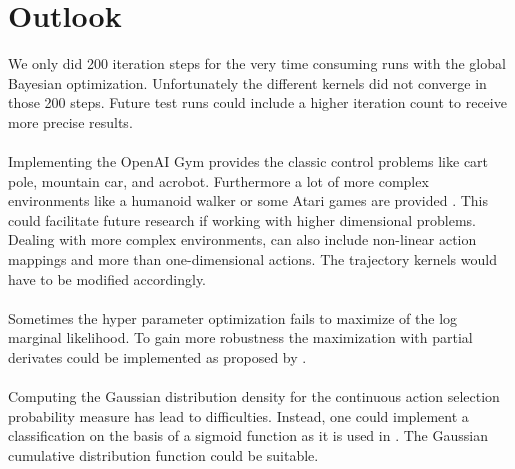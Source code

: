 \chapter{Outlook}
\label{chap:7}

We only did 200 iteration steps for the very time consuming runs with the global Bayesian optimization. Unfortunately the different kernels did not converge in those 200 steps. Future test runs could include a higher iteration count to receive more precise results.\\
\\
Implementing the OpenAI Gym provides the classic control problems like cart pole, mountain car, and acrobot. Furthermore a lot of more complex environments like a humanoid walker or some Atari games are provided \cite{DBLP:journals/corr/BrockmanCPSSTZ16}. This could facilitate future research if working with higher dimensional problems.\\
Dealing with more complex environments, can also include non-linear action mappings and more than one-dimensional actions. The trajectory kernels would have to be modified accordingly.\\
\\
Sometimes the hyper parameter optimization fails to maximize of the log marginal likelihood. To gain more robustness the maximization with partial derivates could be implemented as proposed by \cite{rasmussen2006gaussian, lizotte2008practical}.\\
\\
Computing the Gaussian distribution density for the continuous action selection probability measure has lead to difficulties. Instead, one could implement a classification on the basis of a sigmoid function as it is used in \cite{rasmussen2006gaussian}. The Gaussian cumulative distribution function could be suitable.\\
\\
